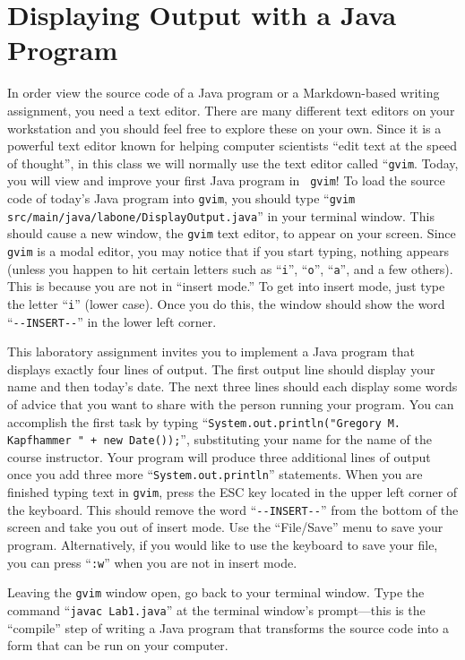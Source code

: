 \documentclass[11pt]{article}
\newcommand{\command}[1]{``\lstinline{#1}''}
\newcommand{\program}[1]{\lstinline{#1}}
\newcommand{\option}[1]{``{#1}''}
\begin{document}
\section*{Displaying Output with a Java Program}

In order view the source code of a Java program or a Markdown-based writing assignment, you need a text editor. There
are many different text editors on your workstation and you should feel free to explore these on your own. Since it is a
powerful text editor known for helping computer scientists ``edit text at the speed of thought'', in this class we will
normally use the text editor called ``{\tt gvim}. Today, you will view and improve your first Java program in {\tt
gvim}! To load the source code of today's Java program into \program{gvim}, you should type \command{gvim
src/main/java/labone/DisplayOutput.java} in your terminal window. This should cause a new window, the \program{gvim}
text editor, to appear on your screen. Since {\tt gvim} is a modal editor, you may notice that if you start typing,
nothing appears (unless you happen to hit certain letters such as \command{i}, \command{o}, \command{a}, and a few
others). This is because you are not in ``insert mode.'' To get into insert mode, just type the letter \command{i}
(lower case). Once you do this, the window should show the word \command{--INSERT--} in the lower left corner.

This laboratory assignment invites you to implement a Java program that displays exactly four lines of output. The first
output line should display your name and then today's date. The next three lines should each display some words of
advice that you want to share with the person running your program. You can accomplish the first task by typing
\command{System.out.println("Gregory M. Kapfhammer " + new Date());}, substituting your name for the name of the course
instructor. Your program will produce three additional lines of output once you add three more
\command{System.out.println} statements. When you are finished typing text in \program{gvim}, press the ESC key located
in the upper left corner of the keyboard. This should remove the word \command{--INSERT--} from the bottom of the screen
and take you out of insert mode. Use the \option{File/Save} menu to save your program. Alternatively, if you would like
to use the keyboard to save your file, you can press \command{:w} when you are not in insert mode.

Leaving the {\tt gvim} window open, go back to your terminal window. Type the command \command{javac Lab1.java} at the
terminal window's prompt---this is the ``compile'' step of writing a Java program that transforms the source code into a
form that can be run on your computer.
\end{document}
